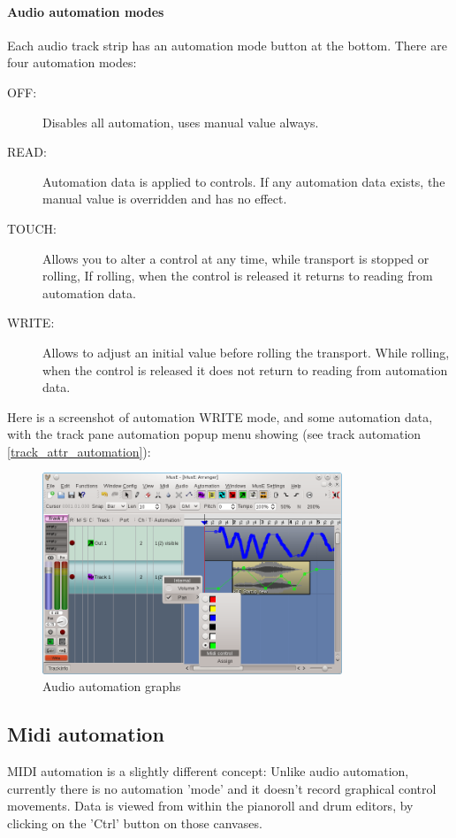 \documentclass[a4paper]{report}
\newcommand{\screenshotwidth}[0]{0.8\textwidth}
\begin{document}
\paragraph{Audio automation modes} 
Each audio track strip has an automation mode button
at the bottom. There are four automation modes:
\begin{description}
\item [{OFF:}] Disables all automation, uses manual value always.
\item [{READ:}] Automation data is applied to controls. If any
automation data exists, the manual value is overridden and has
no effect.
\item [{TOUCH:}] Allows you to alter a control at any time, while
transport is stopped or rolling, If rolling, when the control is
released it returns to reading from automation data. 
\item [{WRITE:}] Allows to adjust an initial value before rolling
the transport. While rolling, when the control is released it does
not return to reading from automation data. 
\end{description}
Here is a screenshot of automation WRITE mode, and some automation
data, with the track pane automation popup menu showing (see track
automation \ref{track_attr_automation}):
\begin{figure}[htp]
\centering \includegraphics[width=\screenshotwidth]
{pics/main_window_with_automation}
\caption{Audio automation graphs}
\label{fig:audio_automation} 
\end{figure}

\label{midi_automation} \subsection{Midi automation} 
MIDI automation is a slightly different concept: Unlike audio
automation, currently there is no automation 'mode' and it doesn't
record graphical control movements. Data is viewed from within
the pianoroll and drum editors, by clicking on the 'Ctrl' button               %
on those canvases.
                                       
\end{document}
